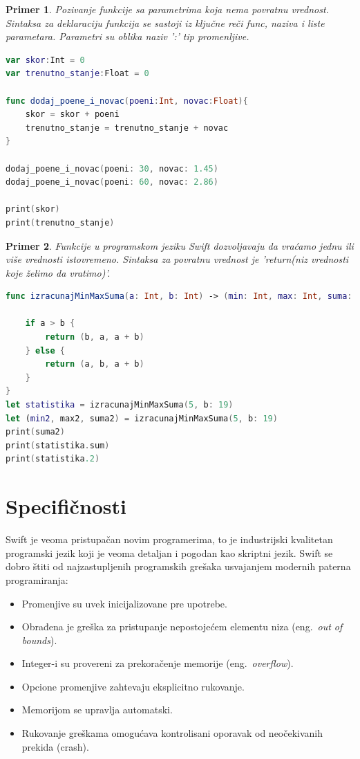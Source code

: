 \documentclass[a4paper]{article}
\newtheorem{primer}{Primer}[section]
\begin{document}
\begin{primer}
Pozivanje funkcije sa parametrima koja nema povratnu vrednost. Sintaksa za deklaraciju funkcija se sastoji iz ključne reči func, naziva i liste parametara. Parametri su oblika naziv ':' tip promenljive.
\end{primer}

\begin{lstlisting}[language=Swift, caption={Funkcije bez povratne vrednosti},frame=single, label=simple]
var skor:Int = 0
var trenutno_stanje:Float = 0

func dodaj_poene_i_novac(poeni:Int, novac:Float){
	skor = skor + poeni
	trenutno_stanje = trenutno_stanje + novac
}

dodaj_poene_i_novac(poeni: 30, novac: 1.45)
dodaj_poene_i_novac(poeni: 60, novac: 2.86)

print(skor)
print(trenutno_stanje)
\end{lstlisting}

\begin{primer}
Funkcije u programskom jeziku Swift dozvoljavaju da vraćamo jednu ili više vrednosti istovremeno. Sintaksa za povratnu vrednost je 'return(niz vrednosti koje želimo da vratimo)'.
\end{primer}

\begin{lstlisting}[language=Swift, caption={Funkcije koje imaju povratnu vrednost},frame=single, label=simple]
func izracunajMinMaxSuma(a: Int, b: Int) -> (min: Int, max: Int, suma: Int) {
    
    if a > b {
        return (b, a, a + b)
    } else {
        return (a, b, a + b)
    }
}
let statistika = izracunajMinMaxSuma(5, b: 19)
let (min2, max2, suma2) = izracunajMinMaxSuma(5, b: 19)
print(suma2)            
print(statistika.sum)   
print(statistika.2)     
\end{lstlisting}

\section{Specifičnosti}	
\label{sec:osmiDeo}
Swift je veoma pristupačan novim programerima, to je industrijski kvalitetan programski jezik koji je veoma detaljan i pogodan kao skriptni jezik. Swift se dobro štiti od najzastupljenih programskih grešaka usvajanjem modernih paterna programiranja:
\begin{itemize}
\item Promenjive su uvek inicijalizovane pre upotrebe.
\item Obrađena je greška za pristupanje nepostojećem elementu niza (eng.~{\em out of bounds}).
\item Integer-i su provereni za prekoračenje memorije (eng.~{\em overflow}).
\item Opcione promenjive zahtevaju eksplicitno rukovanje.
\item Memorijom se upravlja automatski.
\item Rukovanje greškama omogućava kontrolisani oporavak od neočekivanih prekida (crash).
\end{itemize}
\end{document}
